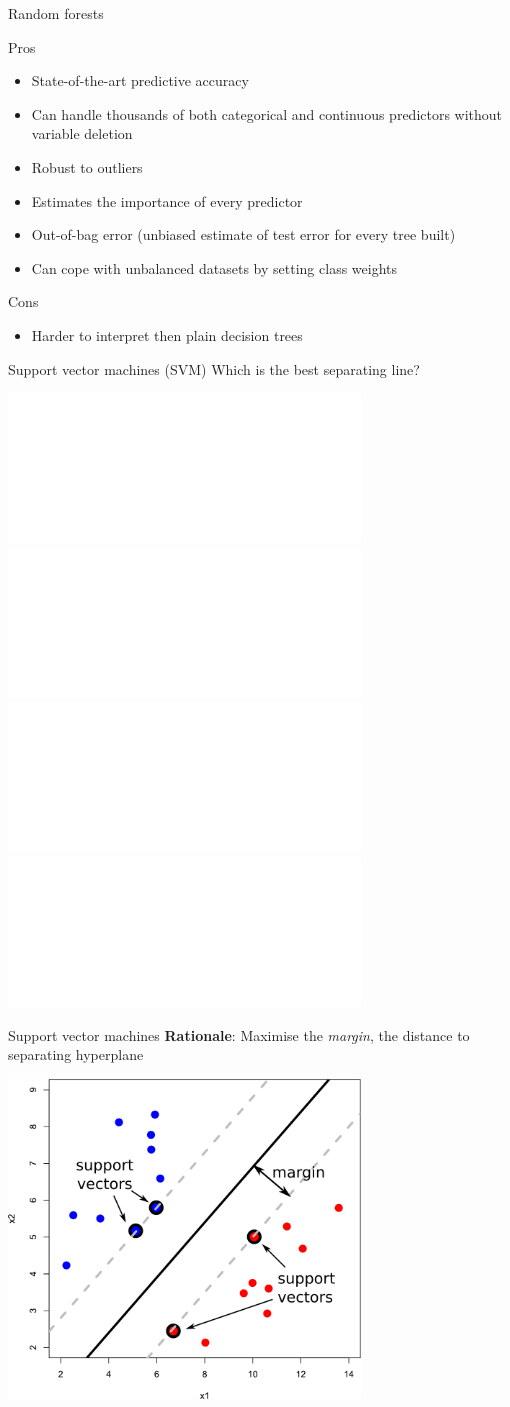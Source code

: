 \documentclass[pdf]{beamer}
\begin{document}
\begin{frame}{Random forests}
\begin{exampleblock}{Pros}
\begin{itemize}
	\item State-of-the-art predictive accuracy
	\item Can handle thousands of both categorical and continuous predictors without variable deletion
	\item Robust to outliers
	\item Estimates the importance of every predictor
	\item Out-of-bag error (unbiased estimate of test error for every tree built)
	\item Can cope with unbalanced datasets by setting class weights
\end{itemize}
\end{exampleblock}
\vfill
\begin{alertblock}{Cons}
\begin{itemize}
	\item Harder to interpret then plain decision trees
\end{itemize}
\end{alertblock}
\end{frame}
\begin{frame}{Support vector machines (SVM)}
Which is the best separating line?
	\begin{center}
		\includegraphics<1>[width=0.7\textwidth]{svmSepLine1.pdf}
		\includegraphics<2>[width=0.7\textwidth]{svmSepLine2.pdf}
		\includegraphics<3>[width=0.7\textwidth]{svmSepLine3.pdf}
		\includegraphics<4>[width=0.7\textwidth]{svmSepLine4.pdf}
	\end{center}
\end{frame}
\begin{frame}{Support vector machines}
\textbf{Rationale}: Maximise the \textit{margin}, the distance to separating hyperplane
\begin{center}
		\includegraphics[width=0.7\textwidth]{svmSketch.pdf}
\end{center}
\end{frame}
\end{document}

